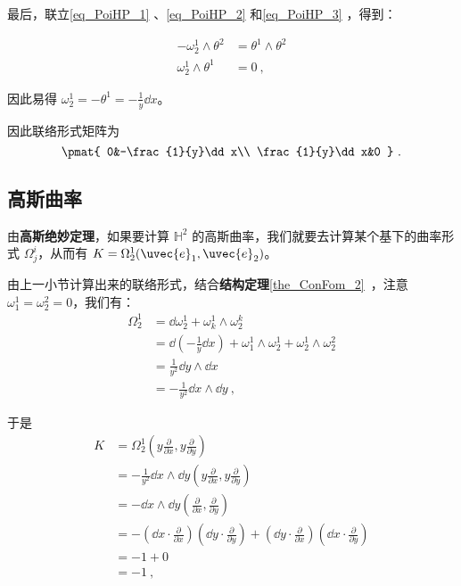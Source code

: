 最后，联立\autoref{eq_PoiHP_1} 、\autoref{eq_PoiHP_2} 和\autoref{eq_PoiHP_3} ，得到：

\begin{equation}
\begin{aligned}
-\omega^1_2\wedge\theta^2&=\theta^1\wedge\theta^2\\
\omega^1_2\wedge\theta^1&=0~,
\end{aligned}
\end{equation}

因此易得 $\omega^1_2=-\theta^1=-\frac{1}{y}\dd x$。

因此联络形式矩阵为
\begin{equation}
\pmat{
    0&-\frac{1}{y}\dd x\\
    \frac{1}{y}\dd x&0
}~.
\end{equation}

\subsection{高斯曲率}


由\textbf{高斯绝妙定理}，如果要计算 $\mathbb{H}^2$ 的高斯曲率，我们就要去计算某个基下的曲率形式 $\Omega^i_j$，从而有 $K=\Omega^1_2(\uvec{e}_1, \uvec{e}_2)$。

由上一小节计算出来的联络形式，结合\textbf{结构定理}\autoref{the_ConFom_2}~，注意 $\omega^1_1=\omega^2_2=0$，我们有：
\begin{equation}
\begin{aligned}
\Omega^1_2&=\dd \omega^1_2+\omega^1_k\wedge\omega^k_2\\
&=\dd(-\frac{1}{y}\dd x)+\omega^1_1\wedge\omega^1_2+\omega^1_2\wedge\omega^2_2\\
&=\frac{1}{y^2}\dd y\wedge\dd x\\
&=-\frac{1}{y^2}\dd x\wedge \dd y~,
\end{aligned}
\end{equation}

于是
\begin{equation}
\begin{aligned}
K&=\Omega^1_2(y\frac{\partial}{\partial x}, y\frac{\partial}{\partial y})\\
&=-\frac{1}{y^2}\dd x\wedge \dd y(y\frac{\partial}{\partial x}, y\frac{\partial}{\partial y})\\
&=-\dd x\wedge \dd y(\frac{\partial}{\partial x}, \frac{\partial}{\partial y})\\
&=-(\dd x\cdot \frac{\partial}{\partial x})(\dd y\cdot \frac{\partial}{\partial y})+(\dd y\cdot \frac{\partial}{\partial x})(\dd x\cdot \frac{\partial}{\partial y})\\
&=-1+0\\
&=-1~,
\end{aligned}
\end{equation}

